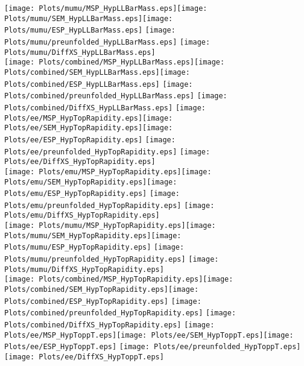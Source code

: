 \documentclass[a4paper,10pt,landscape,pagesize]{scrartcl}
\begin{document}
\texttt{[image: Plots/mumu/MSP\_HypLLBarMass.eps]}\texttt{[image: Plots/mumu/SEM\_HypLLBarMass.eps]}\texttt{[image: Plots/mumu/ESP\_HypLLBarMass.eps]} \texttt{[image: Plots/mumu/preunfolded\_HypLLBarMass.eps]} \texttt{[image: Plots/mumu/DiffXS\_HypLLBarMass.eps]}\\
\texttt{[image: Plots/combined/MSP\_HypLLBarMass.eps]}\texttt{[image: Plots/combined/SEM\_HypLLBarMass.eps]}\texttt{[image: Plots/combined/ESP\_HypLLBarMass.eps]} \texttt{[image: Plots/combined/preunfolded\_HypLLBarMass.eps]} \texttt{[image: Plots/combined/DiffXS\_HypLLBarMass.eps]}
\newpage
\texttt{[image: Plots/ee/MSP\_HypTopRapidity.eps]}\texttt{[image: Plots/ee/SEM\_HypTopRapidity.eps]}\texttt{[image: Plots/ee/ESP\_HypTopRapidity.eps]} \texttt{[image: Plots/ee/preunfolded\_HypTopRapidity.eps]} \texttt{[image: Plots/ee/DiffXS\_HypTopRapidity.eps]}\\
\texttt{[image: Plots/emu/MSP\_HypTopRapidity.eps]}\texttt{[image: Plots/emu/SEM\_HypTopRapidity.eps]}\texttt{[image: Plots/emu/ESP\_HypTopRapidity.eps]} \texttt{[image: Plots/emu/preunfolded\_HypTopRapidity.eps]} \texttt{[image: Plots/emu/DiffXS\_HypTopRapidity.eps]}\\
\texttt{[image: Plots/mumu/MSP\_HypTopRapidity.eps]}\texttt{[image: Plots/mumu/SEM\_HypTopRapidity.eps]}\texttt{[image: Plots/mumu/ESP\_HypTopRapidity.eps]} \texttt{[image: Plots/mumu/preunfolded\_HypTopRapidity.eps]} \texttt{[image: Plots/mumu/DiffXS\_HypTopRapidity.eps]}\\
\texttt{[image: Plots/combined/MSP\_HypTopRapidity.eps]}\texttt{[image: Plots/combined/SEM\_HypTopRapidity.eps]}\texttt{[image: Plots/combined/ESP\_HypTopRapidity.eps]} \texttt{[image: Plots/combined/preunfolded\_HypTopRapidity.eps]} \texttt{[image: Plots/combined/DiffXS\_HypTopRapidity.eps]}
\newpage
\texttt{[image: Plots/ee/MSP\_HypToppT.eps]}\texttt{[image: Plots/ee/SEM\_HypToppT.eps]}\texttt{[image: Plots/ee/ESP\_HypToppT.eps]} \texttt{[image: Plots/ee/preunfolded\_HypToppT.eps]} \texttt{[image: Plots/ee/DiffXS\_HypToppT.eps]}\\
\end{document}
